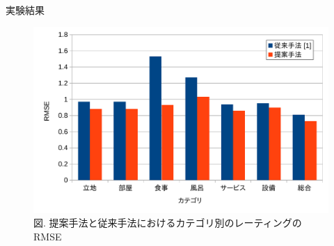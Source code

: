 \documentclass[unicode,10pt]{beamer}
\begin{document}
\begin{frame}{実験結果}{}
  \begin{figure}
    \centering
    \caption{\large %
             図. 提案手法と従来手法におけるカテゴリ別のレーティングのRMSE}
    \includegraphics{fig/graph_of_rmses_per_category.pdf}
  \end{figure}
\end{frame}
\end{document}
